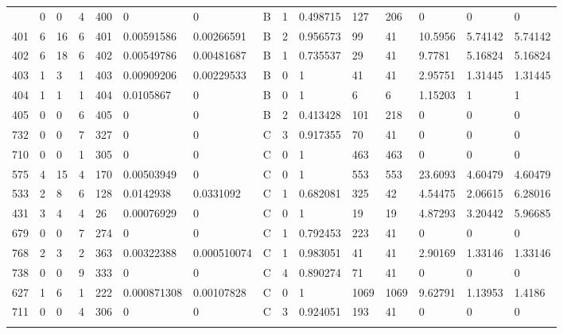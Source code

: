 \begin{latin}
\begin{longtable}{lllllllllllllll}
\begin{comment}
	400 & 0  & 0   & 4  & 400 & 0              & 0              & B & 1  & 0.498715 & 127  & 206  & 0       & 0       & 0       \\
	401 & 6  & 16  & 6  & 401 & 0.00591586     & 0.00266591     & B & 2  & 0.956573 & 99   & 41   & 10.5956 & 5.74142 & 5.74142 \\
	402 & 6  & 18  & 6  & 402 & 0.00549786     & 0.00481687     & B & 1  & 0.735537 & 29   & 41   & 9.7781  & 5.16824 & 5.16824 \\
	403 & 1  & 3   & 1  & 403 & 0.00909206     & 0.00229533     & B & 0  & 1        & 41   & 41   & 2.95751 & 1.31445 & 1.31445 \\
	404 & 1  & 1   & 1  & 404 & 0.0105867      & 0              & B & 0  & 1        & 6    & 6    & 1.15203 & 1       & 1       \\
	405 & 0  & 0   & 6  & 405 & 0              & 0              & B & 2  & 0.413428 & 101  & 218  & 0       & 0       & 0       \\
	732 & 0  & 0   & 7  & 327 & 0              & 0              & C & 3  & 0.917355 & 70   & 41   & 0       & 0       & 0       \\
	710 & 0  & 0   & 1  & 305 & 0              & 0              & C & 0  & 1        & 463  & 463  & 0       & 0       & 0       \\
	575 & 4  & 15  & 4  & 170 & 0.00503949     & 0              & C & 0  & 1        & 553  & 553  & 23.6093 & 4.60479 & 4.60479 \\
	533 & 2  & 8   & 6  & 128 & 0.0142938      & 0.0331092      & C & 1  & 0.682081 & 325  & 42   & 4.54475 & 2.06615 & 6.28016 \\
	431 & 3  & 4   & 4  & 26  & 0.00076929     & 0              & C & 0  & 1        & 19   & 19   & 4.87293 & 3.20442 & 5.96685 \\
	679 & 0  & 0   & 7  & 274 & 0              & 0              & C & 1  & 0.792453 & 223  & 41   & 0       & 0       & 0       \\
	768 & 2  & 3   & 2  & 363 & 0.00322388     & 0.000510074    & C & 1  & 0.983051 & 41   & 41   & 2.90169 & 1.33146 & 1.33146 \\
	738 & 0  & 0   & 9  & 333 & 0              & 0              & C & 4  & 0.890274 & 71   & 41   & 0       & 0       & 0       \\
	627 & 1  & 6   & 1  & 222 & 0.000871308    & 0.00107828     & C & 0  & 1        & 1069 & 1069 & 9.62791 & 1.13953 & 1.4186  \\
	711 & 0  & 0   & 4  & 306 & 0              & 0              & C & 3  & 0.924051 & 193  & 41   & 0       & 0       & 0       \\

\end{comment}
\end{longtable}
\end{latin}
